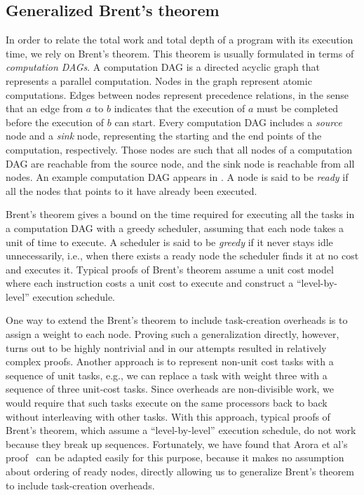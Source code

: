 \subsection{Generalized Brent's theorem}

In order to relate the total work and total depth of a program with
its execution time, we rely on Brent's theorem. This theorem is
usually formulated in terms of {\em computation DAGs}. 
%
%
%
%
A computation DAG is a directed acyclic graph that represents a
parallel computation. Nodes in the graph represent atomic
computations.  Edges between nodes represent precedence relations, in
the sense that an edge from $a$ to $b$ indicates that the execution of
$a$ must be completed before the execution of $b$ can start.  Every
computation DAG includes a {\em source} node and a {\em sink} node,
representing the starting and the end points of the computation,
respectively.  Those nodes are such that all nodes of a computation
DAG are reachable from the source node, and the sink node is reachable
from all nodes.  An example computation DAG appears in .
A node is said to be {\em ready} if all the nodes that points to it
have already been executed.

Brent's theorem gives a bound on the time required for executing all
the tasks in a computation DAG with a greedy scheduler, assuming that
each node takes a unit of time to execute. A scheduler is said to be
{\em greedy} if it never stays idle unnecessarily, i.e., when there
exists a ready node the scheduler finds it at no cost and executes
it.  Typical proofs of Brent's theorem assume a unit cost model where
each instruction costs a unit cost to execute and construct a
``level-by-level'' execution schedule.  


One way to extend the Brent's theorem to include task-creation
overheads is to assign a weight to each node. Proving such a
generalization directly, however, turns out to be highly nontrivial
and in our attempts resulted in relatively complex proofs.  Another
approach is to represent non-unit cost tasks with a sequence of unit
tasks, e.g., we can replace a task with weight three with a sequence
of three unit-cost tasks.  Since overheads are non-divisible work, we
would require that such tasks execute on the same processors back to
back without interleaving with other tasks.  With this approach,
typical proofs of Brent's theorem, which assume a ``level-by-level''
execution schedule, do not work because they break up
sequences. Fortunately, we have found that Arora et al's
proof~\cite{AroraBlPl98} can be adapted easily for this purpose,
because it makes no assumption about ordering of ready nodes, directly
allowing us to generalize Brent's theorem to include task-creation
overheads.

